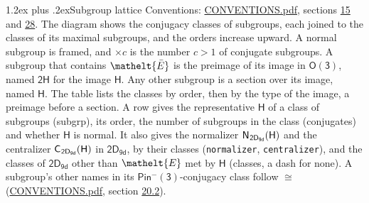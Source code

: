 \documentclass[10pt,a4paper]{article}
\makeatletter
\renewcommand\section{\@startsection{section}{1}{\z@}{-3ex plus -1ex minus -.2ex}%
  {1.2ex plus .2ex}{\normalfont\large\sffamily\bfseries\color{parttitle}}}
\numberwithin{equation}{section}
\newcommand{\eltfont}[1]{{\let\sigma\eltsigma\mathelt{#1}}}
\newcommand{\grp}[1]{\mathsf{#1}}
\newcommand{\cls}[1]{\eltfont{#1}}
\newcommand{\elt}[1]{\eltfont{#1}}
\newcommand{\samecls}{\cong}
\newcommand{\barred}[1]{\bar{#1}}
\newcommand{\hairsp}{\mkern1mu}
\makeatother
\begin{document}
\section{Subgroup lattice}\label{s:subgroups}
Conventions: \href{../../CONVENTIONS.pdf}{CONVENTIONS.pdf}, sections \href{../../../rotation/CONVENTIONS.pdf\#conv.15}{15} and \href{../../CONVENTIONS.pdf\#conv.28}{28}.
The diagram shows the conjugacy classes of subgroups, each joined to the classes of its maximal subgroups, and the orders increase upward. A normal subgroup is framed, and ${\times}c$ is the number $c > 1$ of conjugate subgroups. \label{n:group.H}A subgroup that contains $\elt{\barred{E}}$ is the preimage of its image in $\grp{O(3)}$, named $\grp{2H}$ for the image $\grp{H}$. Any other subgroup is a section over its image, named $\grp{H}$. The table lists the classes by order, then by the type of the image, a preimage before a section. \label{n:head.subgroup}\label{n:head.order}\label{n:head.conjugates}\label{n:head.normal}A row gives the representative $\grp{H}$ of a class of subgroups (subgrp), its order, the number of subgroups in the class (conjugates) and whether $\grp{H}$ is normal. \label{n:group.normalizer}\label{n:group.centralizer}\label{n:head.classes}It also gives the normalizer $\grp{N}_{\hairsp \grp{2D_{9d}}}(\grp{H})$ and the centralizer $\grp{C}_{\hairsp \grp{2D_{9d}}}(\grp{H})$ in $\grp{2D_{9d}}$, by their classes (\texttt{normalizer}, \texttt{centralizer}), and the classes of $\grp{2D_{9d}}$ other than $\cls{E}$ met by $\grp{H}$ (classes, a dash for none). A subgroup's other names in its \href{Pinminus3.pdf}{$\grp{Pin^{-}(3)}$}-conjugacy class follow $\samecls$ (\href{../../CONVENTIONS.pdf}{CONVENTIONS.pdf}, section \href{../../CONVENTIONS.pdf\#conv.20.2}{20.2}).
\end{document}
